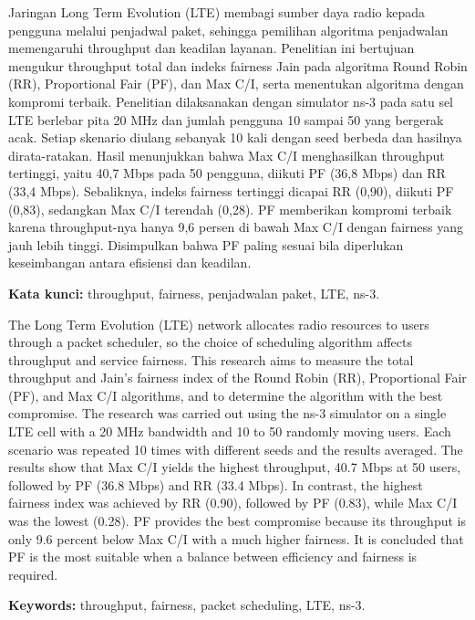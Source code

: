 \begin{abstrak}
Jaringan Long Term Evolution (LTE) membagi sumber daya radio kepada pengguna melalui penjadwal paket, sehingga pemilihan algoritma penjadwalan memengaruhi throughput dan keadilan layanan. Penelitian ini bertujuan mengukur throughput total dan indeks fairness Jain pada algoritma Round Robin (RR), Proportional Fair (PF), dan Max C/I, serta menentukan algoritma dengan kompromi terbaik. Penelitian dilaksanakan dengan simulator ns-3 pada satu sel LTE berlebar pita 20 MHz dan jumlah pengguna 10 sampai 50 yang bergerak acak. Setiap skenario diulang sebanyak 10 kali dengan seed berbeda dan hasilnya dirata-ratakan. Hasil menunjukkan bahwa Max C/I menghasilkan throughput tertinggi, yaitu 40,7 Mbps pada 50 pengguna, diikuti PF (36,8 Mbps) dan RR (33,4 Mbps). Sebaliknya, indeks fairness tertinggi dicapai RR (0,90), diikuti PF (0,83), sedangkan Max C/I terendah (0,28). PF memberikan kompromi terbaik karena throughput-nya hanya 9,6 persen di bawah Max C/I dengan fairness yang jauh lebih tinggi. Disimpulkan bahwa PF paling sesuai bila diperlukan keseimbangan antara efisiensi dan keadilan.

\textbf{Kata kunci:} throughput, fairness, penjadwalan paket, LTE, ns-3.
\end{abstrak}

\begin{halamanbaru}\end{halamanbaru}
\begin{abstrak}
The Long Term Evolution (LTE) network allocates radio resources to users through a packet scheduler, so the choice of scheduling algorithm affects throughput and service fairness. This research aims to measure the total throughput and Jain's fairness index of the Round Robin (RR), Proportional Fair (PF), and Max C/I algorithms, and to determine the algorithm with the best compromise. The research was carried out using the ns-3 simulator on a single LTE cell with a 20 MHz bandwidth and 10 to 50 randomly moving users. Each scenario was repeated 10 times with different seeds and the results averaged. The results show that Max C/I yields the highest throughput, 40.7 Mbps at 50 users, followed by PF (36.8 Mbps) and RR (33.4 Mbps). In contrast, the highest fairness index was achieved by RR (0.90), followed by PF (0.83), while Max C/I was the lowest (0.28). PF provides the best compromise because its throughput is only 9.6 percent below Max C/I with a much higher fairness. It is concluded that PF is the most suitable when a balance between efficiency and fairness is required.

\textbf{Keywords:} throughput, fairness, packet scheduling, LTE, ns-3.
\end{abstrak}

\begin{halamanbaru}\end{halamanbaru}
